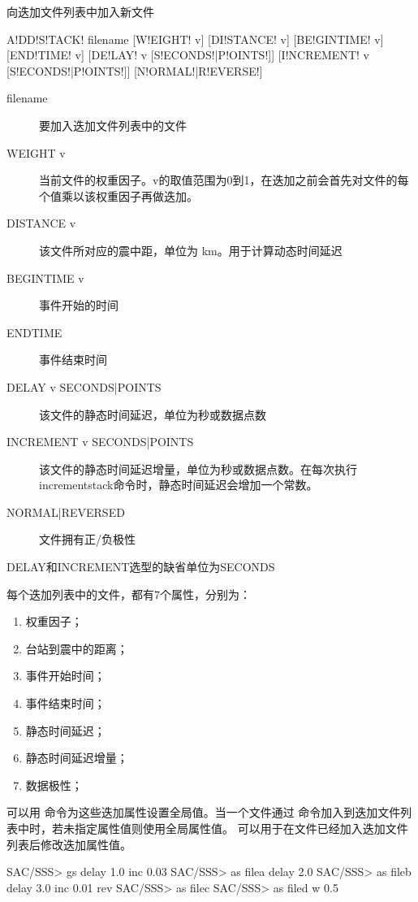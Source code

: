 \label{sss:addstack}

向迭加文件列表中加入新文件

\begin{SACSTX}
A!DD!S!TACK! filename [W!EIGHT! v] [DI!STANCE! v] [BE!GINTIME! v] [END!TIME! v]
    [DE!LAY! v [S!ECONDS!|P!OINTS!]] [I!NCREMENT! v [S!ECONDS!|P!OINTS!]]
    [N!ORMAL!|R!EVERSE!]
\end{SACSTX}

\begin{description}
\item [filename] 要加入迭加文件列表中的文件
\item [WEIGHT v] 当前文件的权重因子。v的取值范围为0到1，在迭加之前会首先对文件的每个值乘以该权重因子再做迭加。
\item [DISTANCE v] 该文件所对应的震中距，单位为 \si{\km}。用于计算动态时间延迟
\item [BEGINTIME v] 事件开始的时间
\item [ENDTIME] 事件结束时间
\item [DELAY v SECONDS|POINTS] 该文件的静态时间延迟，单位为秒或数据点数
\item [INCREMENT v SECONDS|POINTS] 该文件的静态时间延迟增量，单位为秒或数据点数。在每次执行incrementstack命令时，静态时间延迟会增加一个常数。
\item [NORMAL|REVERSED] 文件拥有正/负极性
\end{description}

DELAY和INCREMENT选型的缺省单位为SECONDS

每个迭加列表中的文件，都有7个属性，分别为：
\begin{enumerate}
\item 权重因子；
\item 台站到震中的距离；
\item 事件开始时间；
\item 事件结束时间；
\item 静态时间延迟；
\item 静态时间延迟增量；
\item 数据极性；
\end{enumerate}

可以用  命令为这些迭加属性设置全局值。当一个文件通过
  命令加入到迭加文件列表中时，若未指定属性值则使用全局属性值。
  可以用于在文件已经加入迭加文件列表后修改迭加属性值。

\begin{SACCode}
SAC/SSS> gs delay 1.0 inc 0.03
SAC/SSS> as filea delay 2.0
SAC/SSS> as fileb delay 3.0 inc 0.01 rev
SAC/SSS> as filec
SAC/SSS> as filed w 0.5
\end{SACCode}

